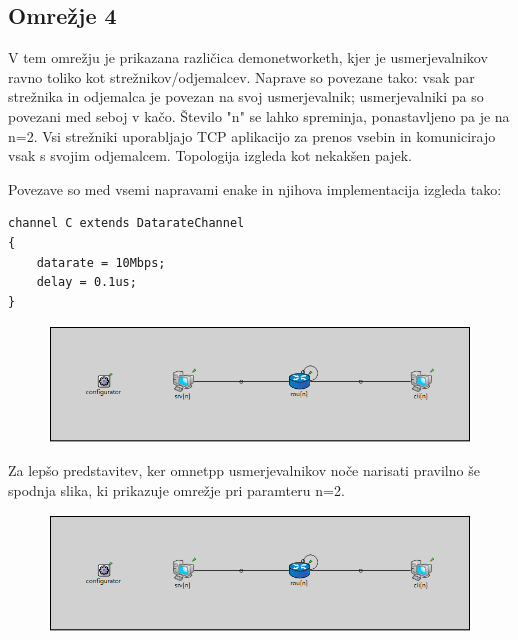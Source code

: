 \documentclass[11pt,a4paper,slovene]{myarticle}
\begin{document}
\pagebreak


\subsection{Omrežje 4}
V tem omrežju je prikazana različica demonetworketh, kjer je usmerjevalnikov ravno toliko kot strežnikov/odjemalcev. Naprave so povezane tako: vsak par strežnika in odjemalca je povezan na svoj usmerjevalnik; usmerjevalniki pa so povezani med seboj v kačo. Število "n" se lahko spreminja, ponastavljeno pa je na n=2. Vsi strežniki uporabljajo TCP aplikacijo za prenos vsebin in komunicirajo vsak s svojim odjemalcem. Topologija izgleda kot nekakšen pajek.

Povezave so med vsemi napravami enake in njihova implementacija izgleda tako:
\begin{lstlisting}
channel C extends DatarateChannel
{
    datarate = 10Mbps;
    delay = 0.1us;
}
\end{lstlisting}

\begin{figure}[h]
  \includegraphics[width=\linewidth]{omrezje4.png}
\end{figure}

Za lepšo predstavitev, ker omnetpp usmerjevalnikov noče narisati pravilno še spodnja slika, ki prikazuje omrežje pri paramteru n=2.

\begin{figure}[h]
  \includegraphics[width=\linewidth]{omrezje4_n_eq_2.png}
\end{figure}
\end{document}
